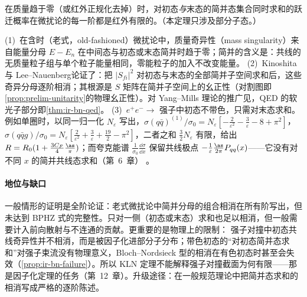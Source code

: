 \begin{theorem}\label{thm:ir-kln}
在质量趋于零（或红外正规化去掉）时，对初态\emph{与}末态的简并态集合同时求和的跃迁概率在微扰论的每一阶都是红外有限的。（本定理只涉及部分子态。）
\end{theorem}
\begin{proofsketch}
(1)~在含时（老式，old-fashioned）微扰论中，质量奇异性（mass singularity）来自能量分母 $E-E_n$ 在中间态与初态或末态简并时趋于零；简并的含义是：共线的无质量粒子组与单个粒子能量相同，零能粒子的加入不改变能量。
(2)~Kinoshita\cite{Kinoshita1962}与 Lee--Nauenberg\cite{LeeNauenberg1964}论证了：把 $|S_{fi}|^2$ 对初态与末态的全部简并子空间求和后，这些奇异分母逐阶相消；其根源是 $S$ 矩阵在简并子空间上的幺正性（对割图即\cref{prop:prelim-unitarity}的物理幺正性）。对 Yang--Mills 理论的推广见\cite{Sterman:1976jh}，QED 的软光子部分即\cref{thm:ir-bn-qed}。
(3)~$e^+e^-\to$ 强子中初态不带色，只需对末态求和。例如单圈时，以同一归一化 $N_\varepsilon$ 写出，$\sigma(q\bar q)^{(1)}/\sigma_0=N_\varepsilon[-\frac2{\varepsilon^2}-\frac3\varepsilon-8+\pi^2]$，$\sigma(q\bar qg)/\sigma_0=N_\varepsilon[\frac2{\varepsilon^2}+\frac3\varepsilon+\frac{19}2-\pi^2]$，二者之和 $\frac32N_\varepsilon$ 有限，给出 $R=R_0(1+\frac{3C_F}4\frac{\as}\pi)$；而夸克能谱 $\frac1{\sigma_0}\frac{\dd\sigma}{\dd x}$ 保留共线极点 $-\frac1\varepsilon\frac{\as}{2\pi}P_{qq}(x)$——它没有对不同 $x$ 的简并共线态求和（第~6~章）%
。
\end{proofsketch}

\paragraph{地位与缺口}
一般情形的证明是全阶论证：老式微扰论中简并分母的组合相消在所有阶写出，但未达到 BPHZ 式的完整性。只对一侧（初态或末态）求和也足以相消，但一般需要计入前向散射与不连通的贡献\cite{Frye:2018xjj}。更重要的是物理上的限制：%
强子对撞中初态共线奇异性并不相消，而是被因子化进部分子分布；带色初态的“对初态简并态求和”对强子束流没有物理意义，Bloch--Nordsieck 型的相消在有色初态时甚至会失效（\cref{prop:ir-bn-failure}）。所以 KLN 定理不能解释强子对撞截面为何有限——那是因子化定理的任务（第~12~章）。升级途径：在一般规范理论中把简并态求和的相消写成严格的逐阶陈述。


